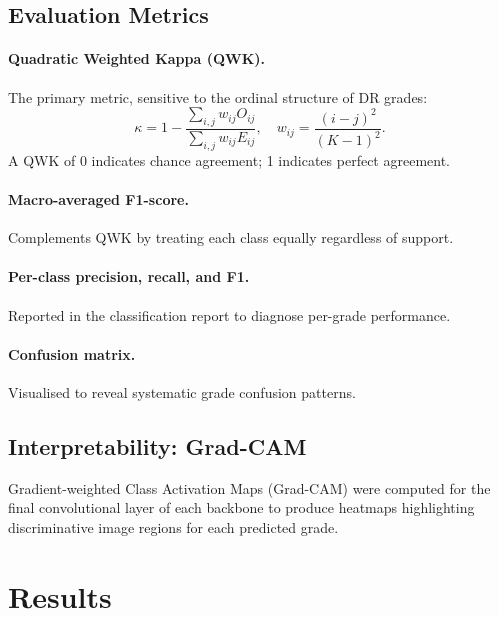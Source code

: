 \documentclass[12pt, a4paper]{article}
\begin{document}
\subsection{Evaluation Metrics}
\label{ssec:metrics}

\paragraph{Quadratic Weighted Kappa (QWK).}
The primary metric, sensitive to the ordinal structure of DR grades:
\begin{equation}
    \kappa = 1 - \frac{\sum_{i,j} w_{ij} O_{ij}}{\sum_{i,j} w_{ij} E_{ij}},
    \quad w_{ij} = \frac{(i-j)^2}{(K-1)^2}.
\end{equation}
A QWK of 0 indicates chance agreement; 1 indicates perfect agreement.

\paragraph{Macro-averaged F1-score.}
Complements QWK by treating each class equally regardless of support.

\paragraph{Per-class precision, recall, and F1.}
Reported in the classification report to diagnose per-grade performance.

\paragraph{Confusion matrix.}
Visualised to reveal systematic grade confusion patterns.

\subsection{Interpretability: Grad-CAM}
\label{ssec:gradcam}

Gradient-weighted Class Activation Maps (Grad-CAM) \cite{TODO_gradcam} were
computed for the final convolutional layer of each backbone to produce heatmaps
highlighting discriminative image regions for each predicted grade.

\section{Results}
\label{sec:results}
\end{document}
